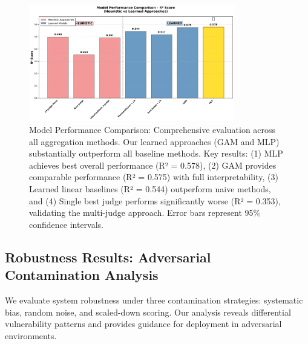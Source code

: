 \begin{figure}[htbp]
    \centering
    \includegraphics[width=0.8\textwidth]{results/full_experiments/baseline_ultrafeedback_2000samples_20250816_213023/model_comparison.png}
    \caption{Model Performance Comparison: Comprehensive evaluation across all aggregation methods. Our learned approaches (GAM and MLP) substantially outperform all baseline methods. Key results: (1) MLP achieves best overall performance (R² = 0.578), (2) GAM provides comparable performance (R² = 0.575) with full interpretability, (3) Learned linear baselines (R² = 0.544) outperform naive methods, and (4) Single best judge performs significantly worse (R² = 0.353), validating the multi-judge approach. Error bars represent 95\% confidence intervals.}
    \label{fig:model_comparison}
\end{figure}

\subsection{Robustness Results: Adversarial Contamination Analysis}

We evaluate system robustness under three contamination strategies: systematic bias, random noise, and scaled-down scoring. Our analysis reveals differential vulnerability patterns and provides guidance for deployment in adversarial environments.

